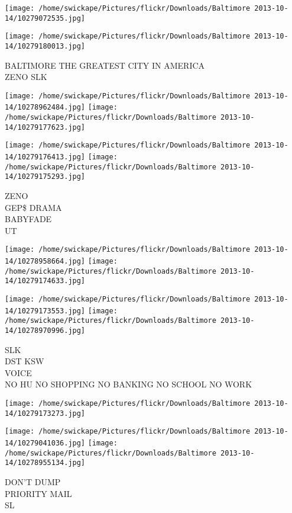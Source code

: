 \documentclass[10pt,letterpaper]{article}
\begin{document}
\texttt{[image: /home/swickape/Pictures/flickr/Downloads/Baltimore 2013-10-14/10279072535.jpg]}

\vspace{0.25in}
\texttt{[image: /home/swickape/Pictures/flickr/Downloads/Baltimore 2013-10-14/10279180013.jpg]}

BALTIMORE THE GREATEST CITY IN AMERICA\\
ZENO SLK
\pagebreak

\texttt{[image: /home/swickape/Pictures/flickr/Downloads/Baltimore 2013-10-14/10278962484.jpg]}
\texttt{[image: /home/swickape/Pictures/flickr/Downloads/Baltimore 2013-10-14/10279177623.jpg]}

\texttt{[image: /home/swickape/Pictures/flickr/Downloads/Baltimore 2013-10-14/10279176413.jpg]}
\texttt{[image: /home/swickape/Pictures/flickr/Downloads/Baltimore 2013-10-14/10279175293.jpg]}

ZENO\\
GEP\$ DRAMA\\
BABYFADE\\
UT
\pagebreak

\texttt{[image: /home/swickape/Pictures/flickr/Downloads/Baltimore 2013-10-14/10278958664.jpg]}
\texttt{[image: /home/swickape/Pictures/flickr/Downloads/Baltimore 2013-10-14/10279174633.jpg]}

\texttt{[image: /home/swickape/Pictures/flickr/Downloads/Baltimore 2013-10-14/10279173553.jpg]}
\texttt{[image: /home/swickape/Pictures/flickr/Downloads/Baltimore 2013-10-14/10278970996.jpg]}

SLK\\
DST KSW\\
VOICE\\
NO HU NO SHOPPING NO BANKING NO SCHOOL NO WORK
\pagebreak

\texttt{[image: /home/swickape/Pictures/flickr/Downloads/Baltimore 2013-10-14/10279173273.jpg]}

\vspace{0.25in}
\texttt{[image: /home/swickape/Pictures/flickr/Downloads/Baltimore 2013-10-14/10279041036.jpg]}
\texttt{[image: /home/swickape/Pictures/flickr/Downloads/Baltimore 2013-10-14/10278955134.jpg]}

DON'T DUMP\\
PRIORITY MAIL\\
SL
\pagebreak
\end{document}

